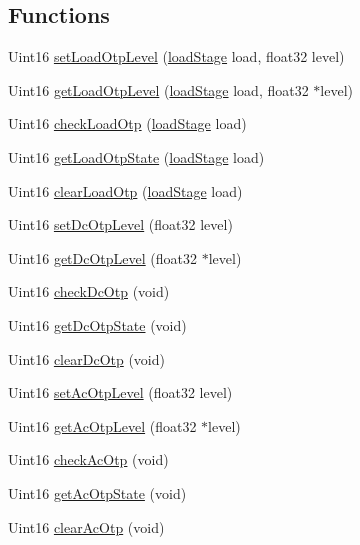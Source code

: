 \subsection*{Functions}
\begin{DoxyCompactItemize}
\item 
Uint16 \hyperlink{a00034_a183ec3e5405ccc50e6eb0225961002ae}{set\-Load\-Otp\-Level} (\hyperlink{a00027_a2820f1e18d921d2f1e97d53404b9fbae}{load\-Stage} load, float32 level)
\item 
Uint16 \hyperlink{a00034_af6ac027036f79748cb87a6c1a4f96690}{get\-Load\-Otp\-Level} (\hyperlink{a00027_a2820f1e18d921d2f1e97d53404b9fbae}{load\-Stage} load, float32 $\ast$level)
\item 
Uint16 \hyperlink{a00034_ac41af2b33ac4b5ac6552ed797a71b25d}{check\-Load\-Otp} (\hyperlink{a00027_a2820f1e18d921d2f1e97d53404b9fbae}{load\-Stage} load)
\item 
Uint16 \hyperlink{a00034_ac26e4a57e49a8a0dbb58aa993a26e6c3}{get\-Load\-Otp\-State} (\hyperlink{a00027_a2820f1e18d921d2f1e97d53404b9fbae}{load\-Stage} load)
\item 
Uint16 \hyperlink{a00034_a8c4197a002661d8a8fc0ee4367c98caa}{clear\-Load\-Otp} (\hyperlink{a00027_a2820f1e18d921d2f1e97d53404b9fbae}{load\-Stage} load)
\item 
Uint16 \hyperlink{a00034_a2472472c83fe665b8c83183b3ebbba98}{set\-Dc\-Otp\-Level} (float32 level)
\item 
Uint16 \hyperlink{a00034_a23c366b0fbd363414e4eda561decbc45}{get\-Dc\-Otp\-Level} (float32 $\ast$level)
\item 
Uint16 \hyperlink{a00034_a66c1d5f4705adf4b8947c6760d6c3e88}{check\-Dc\-Otp} (void)
\item 
Uint16 \hyperlink{a00034_a8f738c9c764f982075747c4561937580}{get\-Dc\-Otp\-State} (void)
\item 
Uint16 \hyperlink{a00034_a1058c22a8c169984c8c615fec65064a4}{clear\-Dc\-Otp} (void)
\item 
Uint16 \hyperlink{a00034_a75a858b6b94340fcb610e7e10e956609}{set\-Ac\-Otp\-Level} (float32 level)
\item 
Uint16 \hyperlink{a00034_a22c179ecb9315b6f4ee1e1d7041f9d69}{get\-Ac\-Otp\-Level} (float32 $\ast$level)
\item 
Uint16 \hyperlink{a00034_aa88957137245403b79608032a773d6fe}{check\-Ac\-Otp} (void)
\item 
Uint16 \hyperlink{a00034_a17dc5aa8abd3776b8bea4283e69cfb93}{get\-Ac\-Otp\-State} (void)
\item 
Uint16 \hyperlink{a00034_ad65b5cbf773b35ebd01a88885a8f7ece}{clear\-Ac\-Otp} (void)

\end{DoxyCompactItemize}
